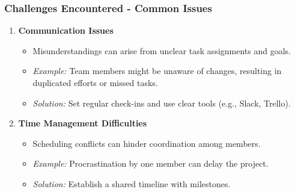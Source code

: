 \documentclass[aspectratio=169]{beamer}
\begin{document}
\begin{frame}[fragile]
  \frametitle{Challenges Encountered - Common Issues}
  \begin{enumerate}
    \item \textbf{Communication Issues}
      \begin{itemize}
        \item Misunderstandings can arise from unclear task assignments and goals.
        \item \textit{Example:} Team members might be unaware of changes, resulting in duplicated efforts or missed tasks.
        \item \textit{Solution:} Set regular check-ins and use clear tools (e.g., Slack, Trello).
      \end{itemize}

    \item \textbf{Time Management Difficulties}
      \begin{itemize}
        \item Scheduling conflicts can hinder coordination among members.
        \item \textit{Example:} Procrastination by one member can delay the project.
        \item \textit{Solution:} Establish a shared timeline with milestones.
      \end{itemize}
  \end{enumerate}
\end{frame}
\end{document}
